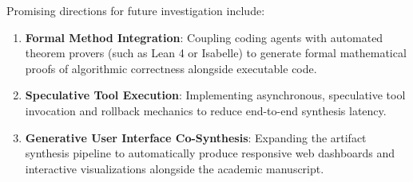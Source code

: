 Promising directions for future investigation include:
\begin{enumerate}
    \item \textbf{Formal Method Integration}: Coupling coding agents with automated theorem provers (such as Lean 4 or Isabelle) to generate formal mathematical proofs of algorithmic correctness alongside executable code.
    \item \textbf{Speculative Tool Execution}: Implementing asynchronous, speculative tool invocation and rollback mechanics \cite{Sui2026SpeculativeExecution, Zhou2026ACRouter} to reduce end-to-end synthesis latency.
    \item \textbf{Generative User Interface Co-Synthesis}: Expanding the artifact synthesis pipeline to automatically produce responsive web dashboards and interactive visualizations alongside the academic manuscript.
\end{enumerate}

